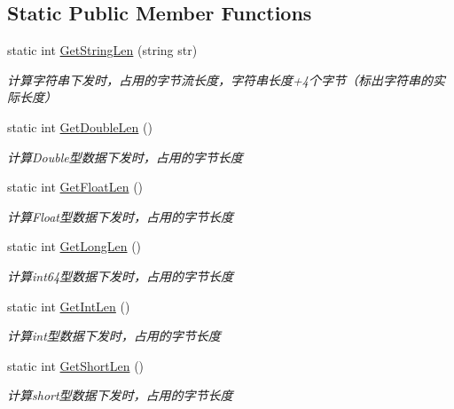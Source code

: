 \subsection*{Static Public Member Functions}
\begin{DoxyCompactItemize}
\item 
static int \mbox{\hyperlink{class_t_net_1_1_service_1_1_data_struct_a4dea4565b3d27b3abb6092bc8b7b1279}{Get\+String\+Len}} (string str)
\begin{DoxyCompactList}\small\item\em 计算字符串下发时，占用的字节流长度，字符串长度+4个字节（标出字符串的实际长度） \end{DoxyCompactList}\item 
static int \mbox{\hyperlink{class_t_net_1_1_service_1_1_data_struct_ada8b754f3582f66598e39c438f6fa5d6}{Get\+Double\+Len}} ()
\begin{DoxyCompactList}\small\item\em 计算\+Double型数据下发时，占用的字节长度 \end{DoxyCompactList}\item 
static int \mbox{\hyperlink{class_t_net_1_1_service_1_1_data_struct_aecd3330176a3bd0ce80facfb731a0773}{Get\+Float\+Len}} ()
\begin{DoxyCompactList}\small\item\em 计算\+Float型数据下发时，占用的字节长度 \end{DoxyCompactList}\item 
static int \mbox{\hyperlink{class_t_net_1_1_service_1_1_data_struct_a32d76c357299f05e8268db849f6e76e3}{Get\+Long\+Len}} ()
\begin{DoxyCompactList}\small\item\em 计算int64型数据下发时，占用的字节长度 \end{DoxyCompactList}\item 
static int \mbox{\hyperlink{class_t_net_1_1_service_1_1_data_struct_a3b4e2ea759d763603769b45559234c73}{Get\+Int\+Len}} ()
\begin{DoxyCompactList}\small\item\em 计算int型数据下发时，占用的字节长度 \end{DoxyCompactList}\item 
static int \mbox{\hyperlink{class_t_net_1_1_service_1_1_data_struct_a4e36cc8f56e1db2a11e048ecd3bf20eb}{Get\+Short\+Len}} ()
\begin{DoxyCompactList}\small\item\em 计算short型数据下发时，占用的字节长度 \end{DoxyCompactList}\item 

\end{DoxyCompactItemize}
